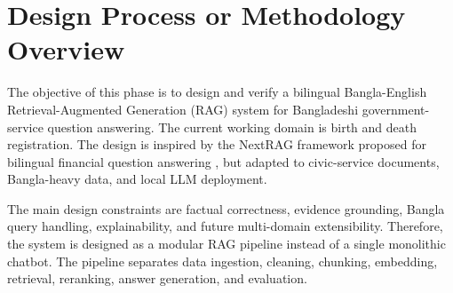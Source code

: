 \section{Design Process or Methodology Overview}

The objective of this phase is to design and verify a bilingual Bangla-English Retrieval-Augmented Generation (RAG) system for Bangladeshi government-service question answering. The current working domain is birth and death registration. The design is inspired by the NextRAG framework proposed for bilingual financial question answering \cite{nextrag2025}, but adapted to civic-service documents, Bangla-heavy data, and local LLM deployment.

The main design constraints are factual correctness, evidence grounding, Bangla query handling, explainability, and future multi-domain extensibility. Therefore, the system is designed as a modular RAG pipeline instead of a single monolithic chatbot. The pipeline separates data ingestion, cleaning, chunking, embedding, retrieval, reranking, answer generation, and evaluation.


